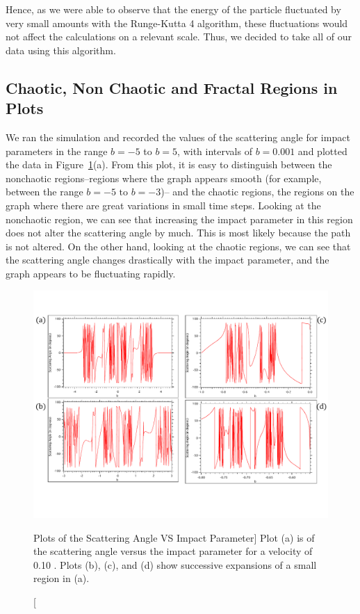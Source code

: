 \documentclass[12pt]{article} %
\begin{document}
Hence, as we were able to observe that the energy of the particle fluctuated by very small amounts with the Runge-Kutta 4 algorithm, these fluctuations would not affect the calculations on a relevant scale. Thus, we decided to take all of our data  using this algorithm.

\subsection{Chaotic, Non Chaotic and Fractal Regions in Plots} \label{Results:chaoticVsNon}




We ran the simulation and recorded the values of the scattering angle for impact parameters in the range $b=-5$ to $b=5$, with intervals of $b = 0.001$ and plotted the data in Figure~\ref{fig:thetaVSb}(a). From this plot, it is easy to distinguish between the nonchaotic regions--regions where the graph appears smooth (for example, between the range $b = -5 \text{ to } b = -3$)-- and the chaotic regions, the regions on the graph where there are great variations in small time steps. Looking at the nonchaotic region, we can see that increasing the impact parameter in this region does not alter the scattering angle by much. This is most likely because the path is not altered. On the other hand, looking at the chaotic regions, we can see that the scattering angle changes drastically with the impact parameter, and the graph appears to be fluctuating rapidly. \\ 



\begin{figure}[H]
	\begin{center}
		\includegraphics[width=1.1\linewidth]{AllGraphsTogether}
		\caption
		[Plots of the Scattering Angle VS Impact Parameter]
		{Plot (a) is of the scattering angle versus the impact parameter for a velocity of 0.10 . Plots (b), (c), and (d) show successive expansions of a small region in (a).}
		\label{fig:thetaVSb}
	\end{center}
\end{figure}
\end{document}

